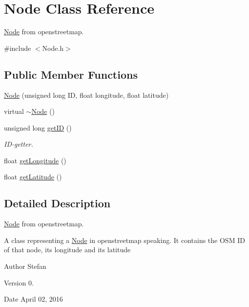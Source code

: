 \hypertarget{classNode}{\section{Node Class Reference}
\label{classNode}
}


\hyperlink{classNode}{Node} from openstreetmap.  




{\ttfamily \#include $<$Node.\-h$>$}

\subsection*{Public Member Functions}
\begin{DoxyCompactItemize}
\item 
\hyperlink{classNode_aa05b9dee7504eb498c92b42a3b7b4feb}{Node} (unsigned long I\-D, float longitude, float latitude)
\item 
virtual \hyperlink{classNode_aa0840c3cb5c7159be6d992adecd2097c}{$\sim$\-Node} ()
\item 
unsigned long \hyperlink{classNode_a0557c98e510afe0964734b397f2fcd2a}{get\-I\-D} ()
\begin{DoxyCompactList}\small\item\em I\-D-\/getter. \end{DoxyCompactList}\item 
float \hyperlink{classNode_ad6be1e5333414b24f7c3ce59a64b5112}{get\-Longitude} ()
\item 
float \hyperlink{classNode_aa6baaf1097d6196c4cac5f3337adfc7f}{get\-Latitude} ()
\end{DoxyCompactItemize}


\subsection{Detailed Description}
\hyperlink{classNode}{Node} from openstreetmap. 

A class representing a \hyperlink{classNode}{Node} in openstreetmap speaking. It contains the O\-S\-M I\-D of that node, its longitude and its latitude

\begin{DoxyAuthor}{Author}
Stefan 
\end{DoxyAuthor}
\begin{DoxyVersion}{Version}
0. 
\end{DoxyVersion}
\begin{DoxyDate}{Date}
April 02, 2016 
\end{DoxyDate}


